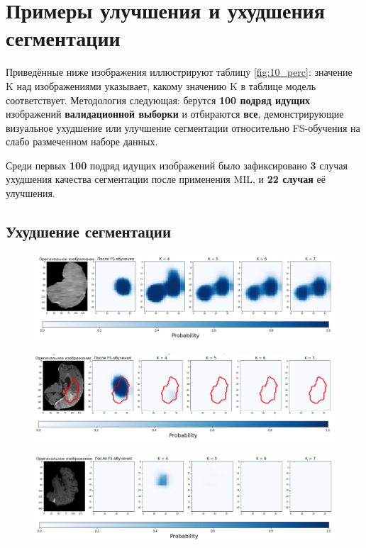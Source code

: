 \newpage
\section{Примеры улучшения и ухудшения сегментации}

Приведённые ниже изображения иллюстрируют таблицу \ref{fig:10_perc}: значение K над изображениями указывает, какому значению K в таблице модель соответствует. Методология следующая: берутся {\bf 100 подряд идущих} изображений {\bf валидационной выборки} и отбираются {\bf все}, демонстрирующие визуальное ухудшение или улучшение сегментации относительно FS-обучения на слабо размеченном наборе данных. 

Среди первых {\bf 100} подряд идущих изображений было зафиксировано {\bf 3} случая ухудшения качества сегментации после применения MIL, и {\bf 22 случая} её улучшения. 

\subsection{Ухудшение сегментации}

\begin{figure}[h!] 
  \center
  \includegraphics [scale=0.7] {images/bad_1.png}
\end{figure}

\begin{figure}[h!] 
  \center
  \includegraphics [scale=0.7] {images/bad_2.png}
\end{figure}


\begin{figure}[h!] 
  \center
  \includegraphics [scale=0.7] {images/bad_3.png}
\end{figure}

